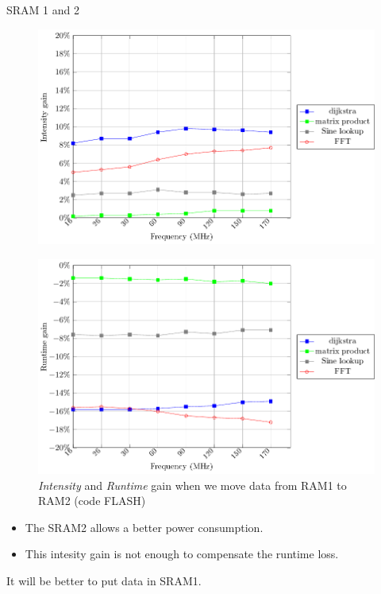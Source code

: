 \documentclass[
	11pt, %
]{beamer}
\begin{document}
\begin{frame}{SRAM 1 and 2}
	\begin{minipage}{0.5\textwidth}
		\begin{figure}
			\includegraphics[scale = 0.35]{data/stm32g_v2/data_ram_data_ram2/intensity.pdf}
		\end{figure}
		\vspace*{-0.5cm}
		\begin{figure}
			\includegraphics[scale = 0.35]{data/stm32g_v2/data_ram_data_ram2/duration.pdf}
			\caption{\emph{Intensity} and \emph{Runtime} gain when we move data from RAM1 to RAM2 (code FLASH)}
		\end{figure}
	\end{minipage}
	\begin{minipage}{0.4\textwidth}
		\begin{itemize}
			\item The SRAM2 allows a better power consumption. 
			\item This intesity gain is not enough to compensate the runtime loss. 
		\end{itemize}
		It will be better to put data in SRAM1.
	\end{minipage}
\end{frame}
\end{document}
